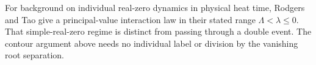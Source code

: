 For background on individual real-zero dynamics in physical heat time,
Rodgers and Tao \cite[\S4, Theorem~11, Eq.~(56)]{rodgerstao} give a
principal-value interaction law in their stated range
\(\Lambda<\lambda\le0\). That simple-real-zero regime is distinct
from passing through a double event. The contour argument above needs
no individual label or division by the vanishing root separation.
